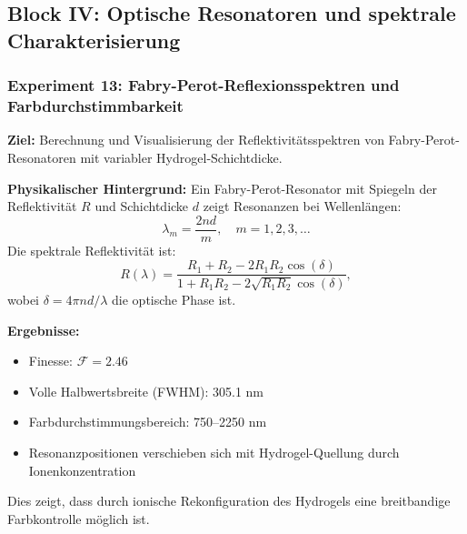 ﻿\documentclass[a4paper,12pt]{scrreprt}
\theoremstyle{definition}
\begin{document}

\subsection{Block IV: Optische Resonatoren und spektrale Charakterisierung}

\subsubsection{Experiment 13: Fabry-Perot-Reflexionsspektren und Farbdurchstimmbarkeit}

\textbf{Ziel:} Berechnung und Visualisierung der Reflektivitätsspektren von Fabry-Perot-Resona\-toren mit variabler Hydrogel-Schichtdicke.

\textbf{Physikalischer Hintergrund:} Ein Fabry-Perot-Resonator mit Spiegeln der Reflektivität $R$ und Schichtdicke $d$ zeigt Resonanzen bei Wellenlängen:
\begin{equation}
	\lambda_m = \frac{2 n d}{m}, \quad m = 1, 2, 3, \ldots
\end{equation}
Die spektrale Reflektivität ist:
\begin{equation}
	R(\lambda) = \frac{R_1 + R_2 - 2 R_1 R_2 \cos(\delta)}{1 + R_1 R_2 - 2 \sqrt{R_1 R_2} \cos(\delta)},
\end{equation}
wobei $\delta = 4\pi n d / \lambda$ die optische Phase ist.

\textbf{Ergebnisse:}
\begin{itemize}
	\item Finesse: $\mathcal{F} = 2.46$
	\item Volle Halbwertsbreite (FWHM): 305.1 nm
	\item Farbdurchstimmungsbereich: 750--2250 nm
	\item Resonanzpositionen verschieben sich mit Hydrogel-Quellung durch Ionenkonzentration
\end{itemize}

Dies zeigt, dass durch ionische Rekonfiguration des Hydrogels eine breitbandige Farbkontrolle möglich ist.
\end{document}
